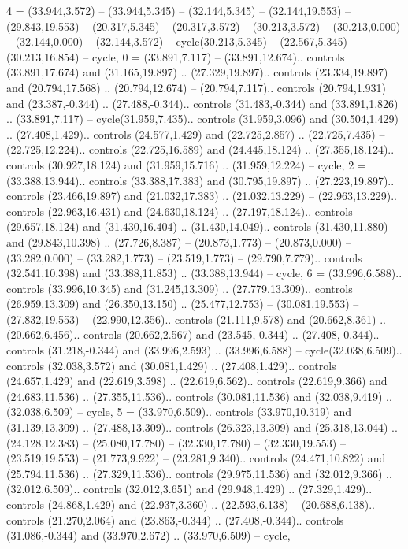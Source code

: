 {4} = {(33.944,3.572) -- (33.944,5.345) -- (32.144,5.345) -- (32.144,19.553) -- (29.843,19.553) -- (20.317,5.345) -- (20.317,3.572) -- (30.213,3.572) -- (30.213,0.000) -- (32.144,0.000) -- (32.144,3.572) -- cycle(30.213,5.345) -- (22.567,5.345) -- (30.213,16.854) -- cycle},
{0} = {(33.891,7.117) -- (33.891,12.674).. controls (33.891,17.674) and (31.165,19.897) .. (27.329,19.897).. controls (23.334,19.897) and (20.794,17.568) .. (20.794,12.674) -- (20.794,7.117).. controls (20.794,1.931) and (23.387,-0.344) .. (27.488,-0.344).. controls (31.483,-0.344) and (33.891,1.826) .. (33.891,7.117) -- cycle(31.959,7.435).. controls (31.959,3.096) and (30.504,1.429) .. (27.408,1.429).. controls (24.577,1.429) and (22.725,2.857) .. (22.725,7.435) -- (22.725,12.224).. controls (22.725,16.589) and (24.445,18.124) .. (27.355,18.124).. controls (30.927,18.124) and (31.959,15.716) .. (31.959,12.224) -- cycle},
{2} = {(33.388,13.944).. controls (33.388,17.383) and (30.795,19.897) .. (27.223,19.897).. controls (23.466,19.897) and (21.032,17.383) .. (21.032,13.229) -- (22.963,13.229).. controls (22.963,16.431) and (24.630,18.124) .. (27.197,18.124).. controls (29.657,18.124) and (31.430,16.404) .. (31.430,14.049).. controls (31.430,11.880) and (29.843,10.398) .. (27.726,8.387) -- (20.873,1.773) -- (20.873,0.000) -- (33.282,0.000) -- (33.282,1.773) -- (23.519,1.773) -- (29.790,7.779).. controls (32.541,10.398) and (33.388,11.853) .. (33.388,13.944) -- cycle},
{6} = {(33.996,6.588).. controls (33.996,10.345) and (31.245,13.309) .. (27.779,13.309).. controls (26.959,13.309) and (26.350,13.150) .. (25.477,12.753) -- (30.081,19.553) -- (27.832,19.553) -- (22.990,12.356).. controls (21.111,9.578) and (20.662,8.361) .. (20.662,6.456).. controls (20.662,2.567) and (23.545,-0.344) .. (27.408,-0.344).. controls (31.218,-0.344) and (33.996,2.593) .. (33.996,6.588) -- cycle(32.038,6.509).. controls (32.038,3.572) and (30.081,1.429) .. (27.408,1.429).. controls (24.657,1.429) and (22.619,3.598) .. (22.619,6.562).. controls (22.619,9.366) and (24.683,11.536) .. (27.355,11.536).. controls (30.081,11.536) and (32.038,9.419) .. (32.038,6.509) -- cycle},
{5} = {(33.970,6.509).. controls (33.970,10.319) and (31.139,13.309) .. (27.488,13.309).. controls (26.323,13.309) and (25.318,13.044) .. (24.128,12.383) -- (25.080,17.780) -- (32.330,17.780) -- (32.330,19.553) -- (23.519,19.553) -- (21.773,9.922) -- (23.281,9.340).. controls (24.471,10.822) and (25.794,11.536) .. (27.329,11.536).. controls (29.975,11.536) and (32.012,9.366) .. (32.012,6.509).. controls (32.012,3.651) and (29.948,1.429) .. (27.329,1.429).. controls (24.868,1.429) and (22.937,3.360) .. (22.593,6.138) -- (20.688,6.138).. controls (21.270,2.064) and (23.863,-0.344) .. (27.408,-0.344).. controls (31.086,-0.344) and (33.970,2.672) .. (33.970,6.509) -- cycle},
